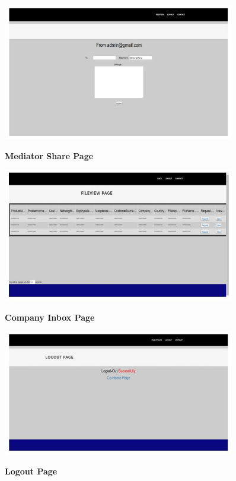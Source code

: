 \documentclass[BTech]{srmuthesis}
\begin{document}
\begin{figure}[H]
\centering
\includegraphics[width=0.9\textwidth]{mediatorsharepage.jpg}
\label{Figure:10} \hspace{10mm}
\caption{\textbf{Mediator Share Page}}
\end{figure}

\begin{figure}[H]
\centering
\includegraphics[width=0.9\textwidth]{companyinbox.jpg}
\label{Figure:10} \hspace{10mm}
\caption{\textbf{Company Inbox Page}}
\end{figure}

\begin{figure}[H]
\centering
\includegraphics[width=0.9\textwidth]{logoutpage.jpg}
\label{Figure:10} \hspace{10mm}
\caption{\textbf{Logout Page}}
\end{figure}
\end{document}
